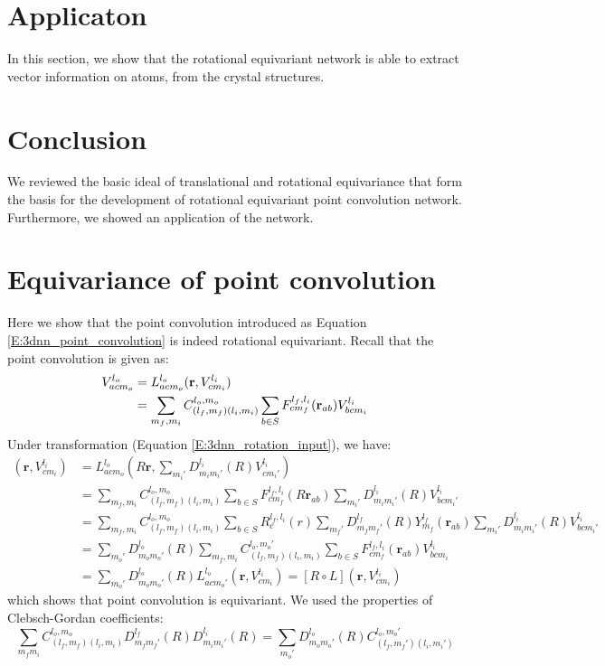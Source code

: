 \documentclass{article}
\begin{document}
\section{Applicaton}
In this section, we show that the rotational equivariant network is able to extract vector information 
on atoms, from the crystal structures.

\section{Conclusion}
We reviewed the basic ideal of translational and rotational equivariance that form the basis
for the development of rotational equivariant point convolution network. Furthermore, we showed
an application of the network. 

\printbibliography[title={Reference}]

\onecolumn

\appendices

\section{Equivariance of point convolution}
\label{A:proof_equivariance_point}
Here we show that the point convolution introduced as Equation \eqref{E:3dnn_point_convolution} is indeed 
rotational equivariant. Recall that the point convolution is given as:
\begin{align*}
    V_{acm_o}^{l_o} &= L^{l_o}_{acm_o} (\mathbf{r}, V_{cm_i}^{l_i}) \notag\\
    &= \sum_{m_f, m_i} C^{l_o,m_o}_{(l_f, m_f)(l_i,m_i)} \sum_{b \in S} F_{cm_f}^{l_f, l_i}(\mathbf{r}_{ab}) V^{l_i}_{bcm_i}
\end{align*}
Under transformation (Equation \eqref{E:3dnn_rotation_input}), we have:
\begin{align*}
    [ L \circ R ] (\mathbf{r}, V_{cm_i}^{l_i}) &= 
    L^{l_o}_{acm_o} (R \mathbf{r}, \sum_{m_i'}D_{m_im_i'}^{l_i}(R)V_{cm_i'}^{l_i}) \\
    &= \sum_{m_f, m_i} C^{l_o,m_o}_{(l_f, m_f)(l_i,m_i)} \sum_{b \in S} F_{cm_f}^{l_f, l_i}(R\mathbf{r}_{ab}) \sum_{m_i'}D_{m_im_i'}^{l_i}(R)V_{bcm_i'}^{l_i} \\
    &= \sum_{m_f, m_i} C^{l_o,m_o}_{(l_f, m_f)(l_i,m_i)} 
            \sum_{b \in S} R_c^{l_f, l_i} (r) \sum_{m_f'} D_{m_fm_f'}^{l_f}(R)  Y_{m_f}^{l_f}(\mathbf{r}_{ab}) \sum_{m_i'}D_{m_im_i'}^{l_i}(R)V_{bcm_i'}^{l_i} \\
    &= \sum_{m_o'} D_{m_om_o'}^{l_o}(R) \sum_{m_f, m_i} C^{l_o,m_o'}_{(l_f, m_f)(l_i,m_i)}  \sum_{b \in S} F_{cm_f}^{l_f, l_i}(\mathbf{r}_{ab}) V_{bcm_i}^{l_i} \\
    &= \sum_{m_o'} D_{m_om_o'}^{l_o}(R) L^{l_o}_{acm_o'} (\mathbf{r}, V_{cm_i}^{l_i}) = [ R \circ L ] (\mathbf{r}, V_{cm_i}^{l_i})
\end{align*}
which shows that point convolution is equivariant. We used the properties of Clebsch-Gordan coefficients:
\begin{equation}
    \sum_{m_fm_i} C^{l_o,m_o}_{(l_f, m_f)(l_i,m_i)} D_{m_fm_f'}^{l_f}(R) D_{m_im_i'}^{l_i}(R) = \sum_{m_o'} D_{m_om_o'}^{l_o}(R) C^{l_o,m_o'}_{(l_f, m_f')(l_i,m_i')}
\end{equation}
\end{document}
